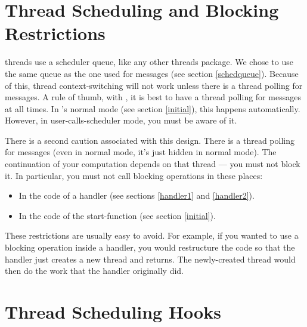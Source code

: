 
\section{Thread Scheduling and Blocking Restrictions}

\converse{} threads use a scheduler queue, like any other threads
package.  We chose to use the same queue as the one used for \converse{}
messages (see section \ref{schedqueue}).  Because of this, thread
context-switching will not work unless there is a thread polling for
messages.  A rule of thumb, with \converse{}, it is best to have a thread
polling for messages at all times.  In \converse{}'s normal mode (see
section \ref{initial}), this happens automatically.  However, in
user-calls-scheduler mode, you must be aware of it.

There is a second caution associated with this design.  There is a
thread polling for messages (even in normal mode, it's just hidden in
normal mode).  The continuation of your computation depends on that
thread --- you must not block it.  In particular, you must not call
blocking operations in these places:

\begin{itemize}

\item{In the code of a \converse{} handler (see sections \ref{handler1}
and \ref{handler2}).}

\item{In the code of the \converse{} start-function (see section
\ref{initial}).}

\end{itemize}

These restrictions are usually easy to avoid.  For example, if you
wanted to use a blocking operation inside a \converse{} handler, you
would restructure the code so that the handler just creates a new
thread and returns.  The newly-created thread would then do the work
that the handler originally did.

\section{Thread Scheduling Hooks}

